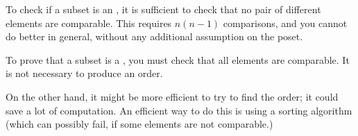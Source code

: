 
\begin{hint}
    To check if a subset is an , it is sufficient to check that no pair of different elements are comparable.
    This requires $n(n-1)$ comparisons, and you cannot do better in general, without any additional assumption on the poset.
\end{hint}

\begin{hint}
    To prove that a subset is a , you must check that all elements are comparable.
    It is not necessary to produce an order.
\end{hint}
\begin{hint}
    On the other hand, it might be more efficient to try to find the  order; it could save a lot of computation.
    An efficient way to do this is using a sorting algorithm (which can possibly fail, if some elements are not comparable.)
\end{hint}
